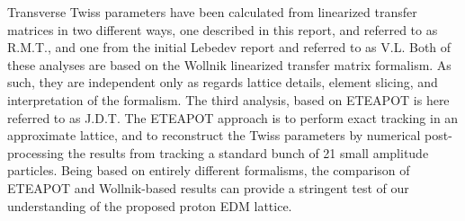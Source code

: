 \documentclass[12]{article}
\begin{document}
Transverse Twiss parameters have been calculated from linearized transfer matrices
in two different ways, one described in this report, and referred to as R.M.T., 
and one from the initial Lebedev report\cite{ValLeb2} and referred to as V.L. 
Both of these analyses are based on the Wollnik\cite{Wollnik} linearized transfer 
matrix formalism. As such, they are independent only as regards lattice details, 
element slicing, and interpretation of the formalism. The third analysis, based
on ETEAPOT is here referred to as J.D.T. The ETEAPOT approach is to perform 
exact tracking in an approximate lattice, and to reconstruct the Twiss parameters
by numerical post-processing the results from tracking
a standard bunch of 21 small amplitude particles.
Being based on entirely different formalisms, the comparison of ETEAPOT and
Wollnik-based results can provide a stringent test of our understanding of 
the proposed proton EDM lattice.
\end{document}
